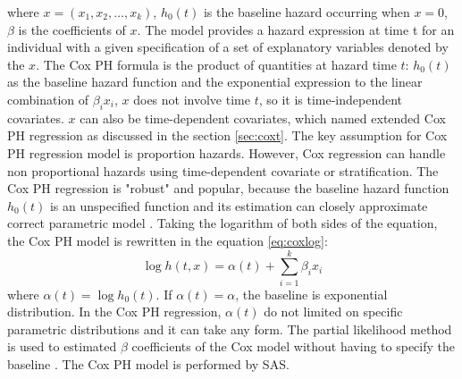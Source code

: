 \documentclass[12pt,letterpaper]{article}
\begin{document}
   where $x=(x_1, x_2, \ldots, x_k)$, $h_0(t)$ is the baseline hazard occurring when $x=0$, $\beta$ is the coefficients of $x$.
   The model provides a hazard expression at time t for an individual with a given specification of a set of explanatory variables denoted by the $x$. The Cox PH formula is the product of quantities at hazard time $t$: $h_0 (t)$ as the baseline hazard function and the exponential expression to the linear combination of $\beta_i x_i$, $x$ does not involve time $t$, so it is time-independent covariates. $x$ can also be time-dependent covariates, which named extended Cox PH regression as discussed in the section \ref{sec:coxt}. The key assumption for Cox PH regression model is proportion hazards. However, Cox regression can handle non proportional hazards using time-dependent covariate or stratification.
   The Cox PH regression is "robust" and popular, because the baseline hazard function $h_0 (t)$ is an unspecified function and its estimation can closely approximate correct parametric model \citep{kleinbaum1998}. Taking the logarithm of both sides of the equation, the Cox PH model is rewritten in the equation \ref{eq:coxlog}:
   \begin{equation}
   \label{eq:coxlog}
   \log{h(t,x)}=\alpha(t)+\sum_{i=1}^{k}\beta_ix_i
   \end{equation}
   where $\alpha(t)=\log{h_0(t)}$. If $\alpha(t)=\alpha$, the baseline is exponential distribution. In the Cox PH regression, $\alpha(t)$ do not limited on specific parametric distributions and it can take any form. The partial likelihood method is used to estimated $\beta$ coefficients of the Cox model without having to specify the baseline \citep{allison1995}. The Cox PH model is performed by SAS.
\end{document}

